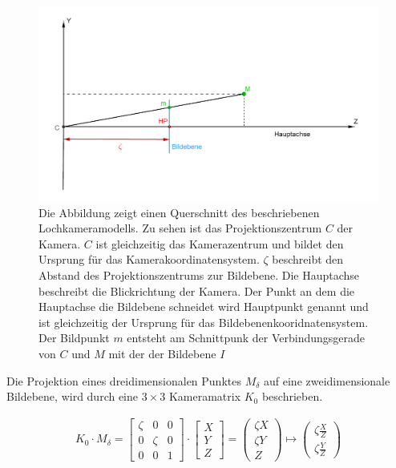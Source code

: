 \begin{figure}[!htb]
	\centering
	\includegraphics[width=.8\linewidth]{images/PinholeCameraModell2D.png}
	\caption[Lochkameramodell Querschnitt]{Die Abbildung zeigt einen Querschnitt des beschriebenen Lochkameramodells. Zu sehen ist das Projektionszentrum $C$ der Kamera. $C$ ist gleichzeitig das Kamerazentrum und bildet den Ursprung für das Kamerakoordinatensystem. $\zeta$ beschreibt den Abstand des Projektionszentrums zur Bildebene. Die Hauptachse beschreibt die Blickrichtung der Kamera. Der Punkt an dem die Hauptachse die Bildebene schneidet wird Hauptpunkt genannt und ist gleichzeitig der Ursprung für das Bildebenenkooridnatensystem. Der Bildpunkt $m$ entsteht am Schnittpunk der Verbindungsgerade von $C$ und $M$ mit der der Bildebene $I$}
	\label{fig:PinholeCamera2D}
\end{figure}

Die Projektion eines dreidimensionalen Punktes $M_\delta$ auf eine zweidimensionale Bildebene, wird durch eine $3 \times 3$ Kameramatrix $K_0$ beschrieben. 

\begin{gather}
	K_0\cdot M_\delta =
	\begin{bmatrix}
		\zeta&0&0\\
		0&\zeta&0\\
		0&0&1
	\end{bmatrix}
	\cdot
	\begin{bmatrix}
		X\\Y\\Z
	\end{bmatrix}
	=
	\begin{pmatrix}
		\zeta X\\ \zeta Y\\ Z
	\end{pmatrix}
	\mapsto
	\begin{pmatrix}
		\zeta \frac{X}{Z}\\ \zeta \frac{Y}{Z}
	\end{pmatrix}
	\label{eq:2.1}
\end{gather}\\

